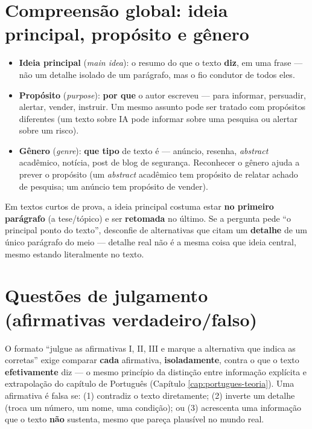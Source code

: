 \section{Compreensão global: ideia principal, propósito e gênero}

\begin{conceito}
\begin{itemize}
\item \textbf{Ideia principal} (\textit{main idea}): o resumo do que o
texto \textbf{diz}, em uma frase --- não um detalhe isolado de um
parágrafo, mas o fio condutor de todos eles.
\item \textbf{Propósito} (\textit{purpose}): \textbf{por que} o autor
escreveu --- para informar, persuadir, alertar, vender, instruir. Um
mesmo assunto pode ser tratado com propósitos diferentes (um texto sobre
IA pode informar sobre uma pesquisa ou alertar sobre um risco).
\item \textbf{Gênero} (\textit{genre}): \textbf{que tipo} de texto é ---
anúncio, resenha, \textit{abstract} acadêmico, notícia, post de blog de
segurança. Reconhecer o gênero ajuda a prever o propósito (um
\textit{abstract} acadêmico tem propósito de relatar achado de pesquisa; um
anúncio tem propósito de vender).
\end{itemize}
\end{conceito}

\begin{regrapratica}
Em textos curtos de prova, a ideia principal costuma estar \textbf{no
primeiro parágrafo} (a tese/tópico) e ser \textbf{retomada} no último. Se a
pergunta pede “o principal ponto do texto”, desconfie de alternativas que
citam um \textbf{detalhe} de um único parágrafo do meio --- detalhe real
não é a mesma coisa que ideia central, mesmo estando literalmente no
texto.
\end{regrapratica}

\section{Questões de julgamento (afirmativas verdadeiro/falso)}

\begin{conceito}
O formato “julgue as afirmativas I, II, III e marque a alternativa que
indica as corretas” exige comparar \textbf{cada} afirmativa,
\textbf{isoladamente}, contra o que o texto \textbf{efetivamente} diz --- o
mesmo princípio da distinção entre informação explícita e extrapolação do
capítulo de Português (Capítulo \ref{cap:portugues-teoria}). Uma
afirmativa é falsa se: (1) contradiz o texto diretamente; (2) inverte um
detalhe (troca um número, um nome, uma condição); ou (3) acrescenta uma
informação que o texto \textbf{não} sustenta, mesmo que pareça plausível no
mundo real.
\end{conceito}

